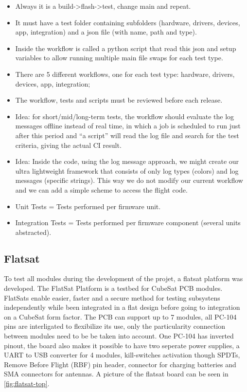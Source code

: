 \begin{itemize}
    \item Always it is a build->flash->test, change main and repeat.
    \item It must have a test folder containing subfolders (hardware, drivers, devices, app, integration) and a json file (with name, path and type).
    \item Inside the workflow is called a python script that read this json and setup variables to allow running multiple main file swaps for each test type.
    \item There are 5 different workflows, one for each test type: hardware, drivers, devices, app, integration;
    \item The workflow, tests and scripts must be reviewed before each release.
    \item Idea: for short/mid/long-term tests, the workflow should evaluate the log messages offline instead of real time, in which a job is scheduled to run just after this period and ``a script'' will read the log file and search for the test criteria, giving the actual CI result.
    \item Idea: Inside the code, using the log message approach, we might create our ultra lightweight framework that consists of only log types (colors) and log messages (specific strings). This way we do not modify our current workflow and we can add a simple scheme to access the flight code.
    \item Unit Tests = Tests performed per firmware unit.
    \item Integration Tests = Tests performed per firmware component (several units abstracted).
\end{itemize}

\subsection{Flatsat}

To test all modules during the development of the projet, a flatsat platform was developed. The FlatSat Platform is a testbed for CubeSat PCB modules. FlatSats enable easier, faster and a secure method for testing subsystens independently while been integrated in a flat design before going to integration on a CubeSat form factor. The PCB can support up to 7 modules, all PC-104 pins are interligated to flexibilize its use, only the particularity connection between modules need to be be taken into account. One PC-104 has inverted pinout, the board also makes it possible to have two seperate power supplies, a UART to USB converter for 4 modules, kill-switches activation though SPDTs, Remove Before Flight (RBF) pin header, connector for charging batteries and SMA connectors for antennas. A picture of the flatsat board can be seen in \autoref{fig:flatsat-top}.

